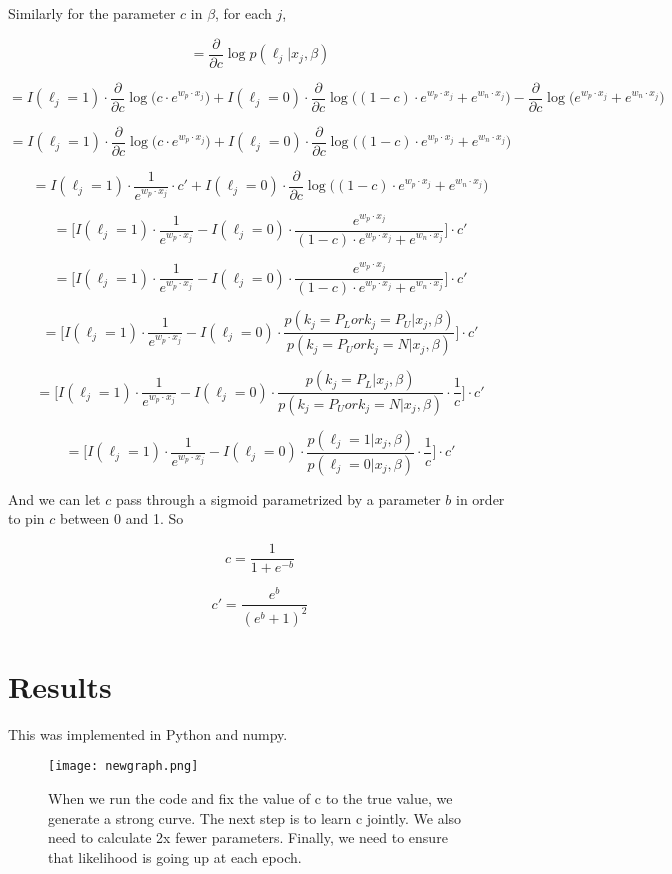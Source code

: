 \documentclass[]{article}
\begin{document}
Similarly for the parameter $c$ in $\beta$, for each $j$,

$$
 = \frac{\partial}{\partial c}\log{p(\ell_j | x_j, \beta)}
$$

$$
 = I(\ell_j=1) \cdot \frac{\partial}{\partial c}
		\log{\Big(
			 c \cdot e^{w_p \cdot x_j}
		\Big)} +
    I(\ell_j=0) \cdot \frac{\partial}{\partial c}
		\log{ \Big( (1 - c) \cdot e^{w_p \cdot x_j}  + e^{w_n \cdot x_j} \Big) }
		- \frac{\partial}{\partial c}
		 \log{\bigg(
			e^{w_p \cdot x_j} + e^{w_n \cdot x_j}
		\bigg)}
$$

$$
 = I(\ell_j=1) \cdot \frac{\partial}{\partial c}
		\log{\Big(
			 c \cdot e^{w_p \cdot x_j}
		\Big)} +
    I(\ell_j=0) \cdot \frac{\partial}{\partial c}
		\log{ \Big( (1 - c) \cdot e^{w_p \cdot x_j}  + e^{w_n \cdot x_j} \Big) }
$$

$$
 = I(\ell_j=1) \cdot \frac{1}{e^{w_p \cdot x_j}} \cdot c' +
    I(\ell_j=0) \cdot \frac{\partial}{\partial c}
		\log{ \Big( (1 - c) \cdot e^{w_p \cdot x_j}  + e^{w_n \cdot x_j} \Big) }
$$

$$
 = \Big[
    I(\ell_j=1) \cdot \frac{1}{e^{w_p \cdot x_j}} -
    I(\ell_j=0) \cdot \frac{e^{w_p \cdot x_j}}{(1 - c) \cdot e^{w_p \cdot x_j} + e^{w_n \cdot x_j}}
    \Big] \cdot c'
$$

$$
 = \Big[
    I(\ell_j=1) \cdot \frac{1}{e^{w_p \cdot x_j}} -
    I(\ell_j=0) \cdot \frac{e^{w_p \cdot x_j}}{(1 - c) \cdot e^{w_p \cdot x_j} + e^{w_n \cdot x_j}}
    \Big] \cdot c'
$$

$$
 = \Big[
    I(\ell_j=1) \cdot \frac{1}{e^{w_p \cdot x_j}} -
    I(\ell_j=0) \cdot \frac{p(k_j=P_L or k_j=P_U | x_j, \beta)}{p(k_j=P_U or k_j=N | x_j, \beta)}
    \Big] \cdot c'
$$

$$
 = \Big[
    I(\ell_j=1) \cdot \frac{1}{e^{w_p \cdot x_j}} -
    I(\ell_j=0) \cdot \frac{p(k_j=P_L | x_j, \beta)}{p(k_j=P_U or k_j=N | x_j, \beta)}  \cdot \frac{1}{c}
    \Big] \cdot c'
$$

$$
 = \Big[
    I(\ell_j=1) \cdot \frac{1}{e^{w_p \cdot x_j}} -
    I(\ell_j=0) \cdot \frac{p(\ell_j=1 | x_j, \beta)}{p(\ell_j=0 | x_j, \beta)}  \cdot \frac{1}{c}
    \Big] \cdot c'
$$

And we can let $c$ pass through a sigmoid parametrized by a parameter $b$ in order to pin $c$ between 0 and 1.  So

$$
c = \frac{1}{1 + e^{-b}}
$$

$$
c' = \frac{e^{b}}{(e^{b} + 1)^2}
$$

\section{Results}

This was implemented in Python and numpy.

\label{Reproduce Elkan 2008 graph with generated data}
\begin{figure}[ht!]
\centering
\texttt{[image: newgraph.png]}
\caption{When we run the code and fix the value of c to the true value, we generate a strong curve. The next step is to learn c jointly. We also need to calculate 2x fewer parameters. Finally, we need to ensure that likelihood is going up at each epoch.}
\end{figure}
\end{document}
